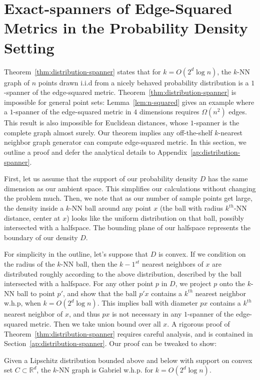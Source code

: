 \section{Exact-spanners of Edge-Squared Metrics in
the Probability Density Setting
}\label{sec:distribution-spanner}

Theorem~\ref{thm:distribution-spanner} states that for $k= O(2^d \log n)$, the $k$-NN graph of $n$ points drawn i.i.d from
a nicely behaved probability distribution is a $1$-spanner of the
edge-squared metric. Theorem~\ref{thm:distribution-spanner} is impossible for
general point sets: Lemma~\ref{lem:n-squared} gives an example
where a $1$-spanner of the edge-squared metric in $4$ dimensions
requires $\Omega(n^2)$
edges. This result is also impossible for Euclidean distances,
whose $1$-spanner is the complete graph almost surely.  
Our theorem implies any off-the-shelf
$k$-nearest neighbor graph generator can compute
edge-squared metric. In this section, we outline a proof and
defer the analytical details to
Appendix~\ref{ap:distribution-spanner}.


First, let us assume that the support of our
probability density $D$ has the same dimension as our ambient space.
This simplifies our calculations without changing the problem
much. Then, we note that as our number of sample points get
large, the density inside a $k$-NN ball around any point $x$ (the ball with radius
$k^{th}$-NN
distance, center at $x$) looks like the uniform distribution
on that ball, possibly intersected with a halfspace. The bounding
plane of our halfspace
represents the boundary of our density $D$.

For simplicity in the outline, let's suppose that $D$ is convex.
If we condition on
the radius of the $k$-NN ball, then the $k-1^{st}$ nearest
neighbors of $x$ are distributed roughly according to the above
distribution, described by the ball intersected with a halfspace.
For any other point $p$ in $D$, we project $p$ onto the $k$-NN
ball to point $p'$, and show that the ball $p'x$ contains a $k^{th}$ nearest
neighbor w.h.p, when $k=O(2^d \log n)$. This
implies ball with diameter $px$ contains a $k^{th}$ nearest
neighbor of $x$, and thus $px$ is not necessary in any
$1$-spanner of the edge-squared metric. Then we take union bound
over all $x$.
A rigorous proof of
Theorem~\ref{thm:distribution-spanner} requires careful analysis, 
and is contained in
Section~\ref{ap:distribution-spanner}.  
Our proof can be tweaked to show:
\begin{theorem}
  Given a Lipschitz distribution bounded above and below with support on convex set $C \subset
  \mathbb{R}^d$, the $k$-NN graph is Gabriel w.h.p. for $k =
  O(2^d \log n)$.
\end{theorem}

